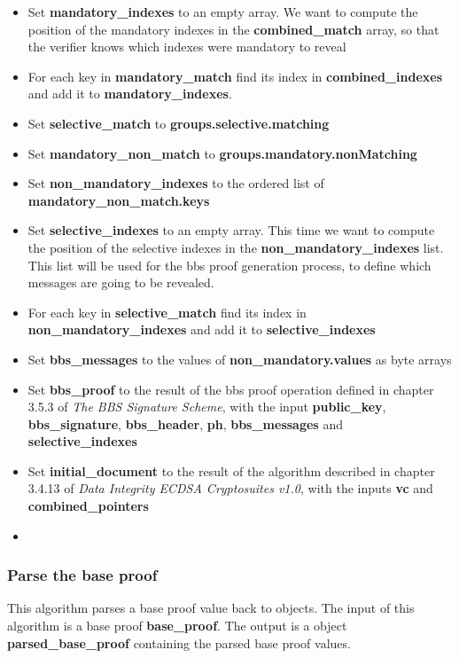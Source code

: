 \documentclass[
	a4paper               %
	,bibliography=totoc   %
	,listof=totoc         %
	,monolingual
	twoside=false,
]{bfhthesis}              %
\begin{document}
\begin{itemize}
	\item Set \textbf{mandatory\_indexes} to an empty array. We want to compute the position of the mandatory indexes in the \textbf{combined\_match} array, so that the verifier knows which indexes were mandatory to reveal
	\item For each key in \textbf{mandatory\_match} find its index in \textbf{combined\_indexes} and add it to \textbf{mandatory\_indexes}.
	\item Set \textbf{selective\_match} to \textbf{groups.selective.matching}
	\item Set \textbf{mandatory\_non\_match} to \textbf{groups.mandatory.nonMatching}
	\item Set \textbf{non\_mandatory\_indexes} to the ordered list of \textbf{mandatory\_non\_match.keys}
	\item Set \textbf{selective\_indexes} to an empty array. This time we want to compute the position of the selective indexes in the \textbf{non\_mandatory\_indexes} list. This list will be used for the bbs proof generation process, to define which messages are going to be revealed.
	\item For each key in \textbf{selective\_match} find its index in \textbf{non\_mandatory\_indexes} and add it to \textbf{selective\_indexes}
	\item Set \textbf{bbs\_messages} to the values of \textbf{non\_mandatory.values} as byte arrays
	\item Set \textbf{bbs\_proof} to the result of the bbs proof operation defined in chapter 3.5.3 of \textit{The BBS Signature Scheme}\cite{bbs-signature-scheme}, with the input \textbf{public\_key}, \textbf{bbs\_signature}, \textbf{bbs\_header}, \textbf{ph}, \textbf{bbs\_messages} and \textbf{selective\_indexes}
	\item Set \textbf{initial\_document} to the result of the algorithm described in chapter 3.4.13 of \textit{Data Integrity ECDSA Cryptosuites v1.0}\cite{ecdsa}, with the inputs \textbf{vc} and \textbf{combined\_pointers}
	\item 
\end{itemize}


\subsubsection{Parse the base proof}
\label{subsub:parsebaseproof}

This algorithm parses a base proof value back to objects.
The input of this algorithm is a base proof \textbf{base\_proof}.
The output is a object \textbf{parsed\_base\_proof} containing the parsed base proof values.
\end{document}
